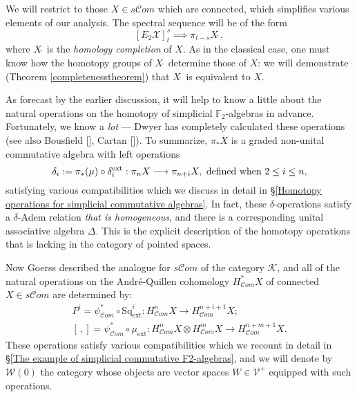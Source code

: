 \documentclass[11pt]{amsart} \renewcommand{\baselinestretch}{1.2}
\theoremstyle{plain}
\theoremstyle{definition}
\renewcommand{\to}{\longrightarrow}
\newcommand{\scrC}{\mathscr{C}}
\newcommand{\calX}{\mathcal{X}}
\newcommand{\calV}{\mathcal{V}}
\newcommand{\calw}{\mathcal{W}}
\newcommand{\calk}{\mathcal{K}}
\newcommand{\vect}[2]{\calV^{#1}_{#2}}
\newcommand{\ExtCohOp}{\mathrm{Sq}_\mathrm{ext}}
\newcommand{\ExtCohProd}{\mu_\mathrm{ext}}
\newcommand{\F}{\mathbb{F}}
\newcommand{\algs}{{\scrC\!\textit{om}}}
\newcommand{\Ftwo}{\F_2}
\newcommand{\E}[5]{[E^{#1}_{#2}#3]^{#4}_{#5}}
\begin{document}
\begin{Introduction}
We will restrict to those $X\in s\algs$ which are connected, which simplifies various elements of our analysis.
The spectral sequence will be of the form
\[\E{}{2}{\calX}{s}{t} \implies \pi_{t-s}X\hat{\ },\]
where $X\hat{\ }$ is the \emph{homology completion} of $X$. As in the classical case, one must know how the homotopy groups of $X\hat{\ }$ determine those of $X$: we will demonstrate (Theorem \ref{completenesstheorem}) that $X\hat{\ }$ is equivalent to $X$.

As forecast by the earlier discussion, it will help to know a little about the natural operations on the homotopy of simplicial $\Ftwo$-algebras in advance. Fortunately, we know a \emph{lot} --- Dwyer \cite{DwyerHtpyOpsSimpComAlg.pdf} has completely calculated these operations (see also Bousfield [], Cartan []). To summarize, $\pi_*X$ is a graded non-unital commutative algebra with left operations
\[\delta_i:=\pi_*(\mu)\circ\delta_i^\textup{ext}:\pi_nX\to \pi_{n+i}X,\textup{ defined when }2\leq i\leq n,\]
satisfying various compatibilities which we discuss in detail in \S\ref{Homotopy operations for simplicial commutative algebras}. In fact, these $\delta$-operations satisfy a $\delta$-Adem relation \emph{that is homogeneous}, and there is a corresponding unital associative algebra $\Delta$. This is the explicit description of the homotopy operations that is lacking in the category of pointed spaces.

Now Goerss described the analogue for $s\algs$ of the category $\calk$, and  all of the natural operations on the Andr\'e-Quillen cohomology $H^*_\algs X$ of connected $X\in s\algs$ are determined by:
\begin{gather*}
P^i=\psi^*_{\algs}\circ\ExtCohOp^i:H^n_{\algs}X\to H_{\algs}^{n+i+1}X;\\
[\,,]=\psi^*_{\algs}\circ\ExtCohProd :H_{\algs}^nX\otimes H_{\algs}^mX\to H_{\algs}^{n+m+1}X.
\end{gather*}
These operations satisfy various compatibilities which we recount in detail in \S\ref{The example of simplicial commutative F2-algebras}, and we will denote by $\calw(0)$ the category whose objects are vector spaces $W\in\vect{+}{}$ equipped with such operations.


\end{Introduction}
\end{document}
